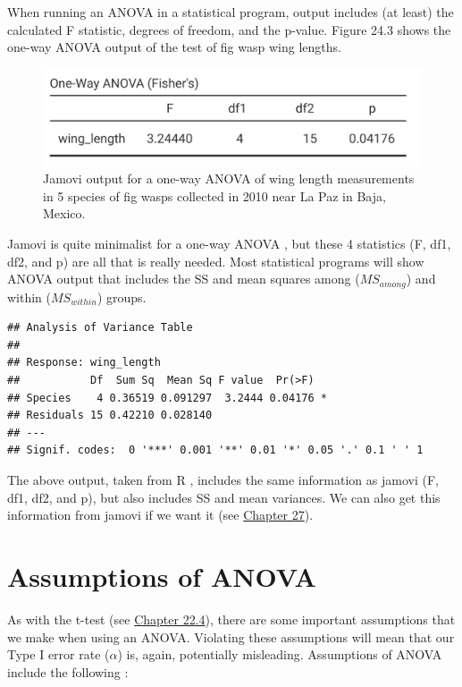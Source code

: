 \documentclass[
]{scrbook}
\begin{document}
When running an ANOVA in a statistical program, output includes (at least) the calculated F statistic, degrees of freedom, and the p-value.
Figure 24.3 shows the one-way ANOVA output of the test of fig wasp wing lengths.

\begin{figure}
\includegraphics[width=0.6\linewidth]{img/jamovi_ANOVA_output} \caption{Jamovi output for a one-way ANOVA of wing length measurements in 5 species of fig wasps collected in 2010 near La Paz in Baja, Mexico.}\label{fig:unnamed-chunk-114}
\end{figure}

Jamovi is quite minimalist for a one-way ANOVA \citep{Jamovi2022}, but these 4 statistics (F, df1, df2, and p) are all that is really needed.
Most statistical programs will show ANOVA output that includes the SS and mean squares among (\(MS_{among}\)) and within (\(MS_{within}\)) groups.

\begin{verbatim}
## Analysis of Variance Table
## 
## Response: wing_length
##           Df  Sum Sq  Mean Sq F value  Pr(>F)  
## Species    4 0.36519 0.091297  3.2444 0.04176 *
## Residuals 15 0.42210 0.028140                  
## ---
## Signif. codes:  0 '***' 0.001 '**' 0.01 '*' 0.05 '.' 0.1 ' ' 1
\end{verbatim}

The above output, taken from R \citep{Rproject}, includes the same information as jamovi (F, df1, df2, and p), but also includes SS and mean variances.
We can also get this information from jamovi if we want it (see \protect\hyperlink{Chapter_27}{Chapter 27}).

\hypertarget{assumptions-of-anova}{%
\section{Assumptions of ANOVA}\label{assumptions-of-anova}}

As with the t-test (see \protect\hyperlink{assumptions-of-t-tests}{Chapter 22.4}), there are some important assumptions that we make when using an ANOVA.
Violating these assumptions will mean that our Type I error rate (\(\alpha\)) is, again, potentially misleading.
Assumptions of ANOVA include the following \citep{Box1978, Sokal1995}:
\end{document}
